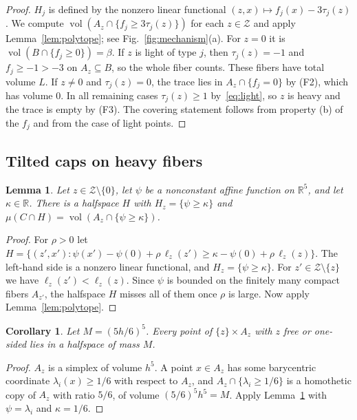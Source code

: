 \documentclass[11pt]{article}
\newtheorem{lemma}[theorem]{Lemma}
\newtheorem{corollary}[theorem]{Corollary}
\newcommand{\R}{\mathbb{R}}
\newcommand{\Zcal}{\mathcal{Z}}
\newcommand{\1}{\mathbf{1}}
\DeclareMathOperator{\vol}{vol}
\begin{document}
\begin{proof}
$H_j$ is defined by the nonzero linear functional $(z,x)\mapsto f_j(x)-3\tau_j(z)$. We compute
$\vol(A_z\cap\{f_j\ge3\tau_j(z)\})$ for each $z\in\Zcal$ and apply Lemma~\ref{lem:polytope}; see
Fig.~\ref{fig:mechanism}(a). For $z=0$ it is $\vol(B\cap\{f_j\ge0\})=\beta$. If $z$ is light of type $j$, then
$\tau_j(z)=-1$ and $f_j\ge-1>-3$ on $A_z\subseteq B$, so the whole fiber counts. These fibers have total volume $L$. If
$z\ne0$ and $\tau_j(z)=0$, the trace lies in $A_z\cap\{f_j=0\}$ by (F2), which has volume $0$. In all remaining cases
$\tau_j(z)\ge1$ by~\eqref{eq:light}, so $z$ is heavy and the trace is empty by (F3). The covering statement follows from
property (b) of the $f_j$ and from the case of light points.
\end{proof}

\subsection{Tilted caps on heavy fibers}

\begin{lemma}\label{lem:tilt}
Let $z\in\Zcal\setminus\{0\}$, let $\psi$ be a nonconstant affine function on $\R^5$, and let $\kappa\in\R$. There is a
halfspace $H$ with $H_z=\{\psi\ge\kappa\}$ and $\mu(C\cap H)=\vol(A_z\cap\{\psi\ge\kappa\})$.
\end{lemma}

\begin{proof}
For $\rho>0$ let $H=\{(z',x'):\psi(x')-\psi(0)+\rho\,\ell_z(z')\ge\kappa-\psi(0)+\rho\,\ell_z(z)\}$. The left-hand side is a
nonzero linear functional, and $H_z=\{\psi\ge\kappa\}$. For $z'\in\Zcal\setminus\{z\}$ we have $\ell_z(z')<\ell_z(z)$. Since
$\psi$ is bounded on the finitely many compact fibers $A_{z'}$, the halfspace $H$ misses all of them once $\rho$ is large.
Now apply Lemma~\ref{lem:polytope}.
\end{proof}

\begin{corollary}\label{cor:free}
Let $M=(5h/6)^5$. Every point of $\{z\}\times A_z$ with $z$ free or one-sided lies in a halfspace of mass $M$.
\end{corollary}

\begin{proof}
$A_z$ is a simplex of volume $h^5$. A point $x\in A_z$ has some barycentric coordinate $\lambda_i(x)\ge1/6$ with respect to
$A_z$, and $A_z\cap\{\lambda_i\ge1/6\}$ is a homothetic copy of $A_z$ with ratio $5/6$, of volume $(5/6)^5h^5=M$. Apply
Lemma~\ref{lem:tilt} with $\psi=\lambda_i$ and $\kappa=1/6$.
\end{proof}
\end{document}
